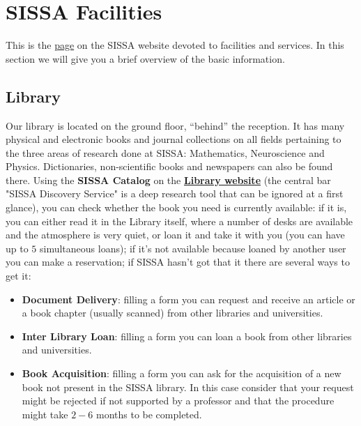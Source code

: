 \documentclass{sissavademecum}
\begin{document}

\chapter{SISSA Facilities}

This is the \href{https://www.sissa.it/facilities-and-services}{page} on the SISSA website devoted to facilities and services. In this section we will give you a brief overview of the basic information.


\section{Library}
\label{sec:Library}

Our library
is located on the ground floor, ``behind'' the reception. It has many physical and electronic books and journal collections on all fields pertaining to the three areas of research done at SISSA: Mathematics, Neuroscience and Physics. Dictionaries, non-scientific books and newspapers can also be found there. Using the \textbf{SISSA Catalog} on the  \href{http://library.sissa.it}{\textbf{Library website}} (the central bar "SISSA Discovery Service" is a deep research tool that can be ignored at a first glance), you can check whether the book you need is currently available: if it is, you can either read it in the Library itself, where a number of desks are available and the atmosphere is very quiet, or loan it  and take it with you (you can have up to $5$ simultaneous loans); if it's not available because loaned by another user you can make a reservation; if SISSA hasn't got that it there are several ways to get it:
\begin{itemize}
    \item \textbf{Document Delivery}: filling a form you can request and receive an article or a book chapter (usually scanned) from other libraries and universities.
    \item \textbf{Inter Library Loan}: filling a form you can loan  a book from other libraries and universities.
    \item \textbf{Book Acquisition}: filling a form you can ask for the acquisition of a new book not present in the SISSA library. In this case consider that your request might be rejected if not supported by a professor and that the procedure might take $2-6$ months to be completed. 
\end{itemize}
\end{document}
